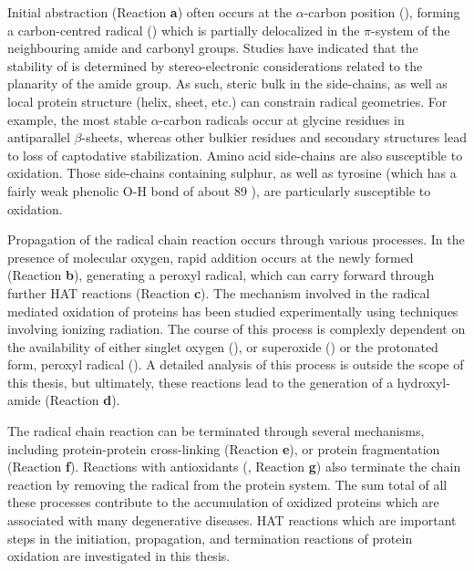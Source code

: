 Initial abstraction (Reaction \textbf{a}) often occurs at the $\alpha$-carbon position (), forming a carbon-centred radical () which is partially delocalized in the $\pi$-system of the neighbouring amide and carbonyl groups. Studies have indicated that the stability of  is determined by stereo-electronic considerations related to the planarity of the amide group.\cite{Salamone2014b} As such, steric bulk in the side-chains, as well as local protein structure (helix, sheet, etc.) can constrain radical geometries. For example, the most stable $\alpha$-carbon radicals occur at glycine residues in antiparallel $\beta$-sheets, whereas other bulkier residues and secondary structures lead to loss of captodative stabilization.\cite{Rauk2000} Amino acid side-chains are also susceptible to oxidation. Those side-chains containing sulphur,\cite{Stadtman2004} as well as tyrosine (which has a fairly weak phenolic O-H bond of about 89 \kcalmol),\cite{Mulder2005} are particularly susceptible to oxidation.

Propagation of the radical chain reaction occurs through various processes. In the presence of molecular oxygen, rapid addition occurs at the newly formed  (Reaction \textbf{b}), generating a peroxyl radical, which can carry forward through further HAT reactions (Reaction \textbf{c}).\cite{Stadtman2003} The mechanism involved in the radical mediated oxidation of proteins has been studied experimentally using techniques involving ionizing radiation.\cite{Garrison1962,Garrison1987} The course of this process is complexly dependent on the availability of either singlet oxygen (), or superoxide () or the protonated form, peroxyl radical (). A detailed analysis of this process is outside the scope of this thesis, but ultimately, these reactions lead to the generation of a hydroxyl-amide (Reaction \textbf{d}).

The radical chain reaction can be terminated through several mechanisms, including protein-protein cross-linking (Reaction \textbf{e}), or protein fragmentation (Reaction \textbf{f}). Reactions with antioxidants (, Reaction \textbf{g}) also terminate the chain reaction by removing the radical from the protein system. The sum total of all these processes contribute to the accumulation of oxidized proteins which are associated with many degenerative diseases.\cite{Halliwell2006} HAT reactions which are important steps in the initiation, propagation, and termination reactions of protein oxidation are investigated in this thesis.

